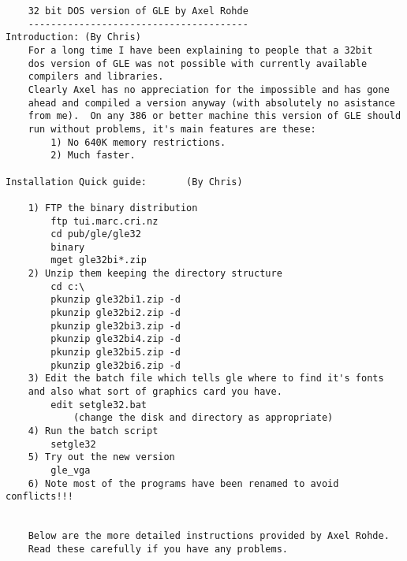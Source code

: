 \begin{center}
\begin{minipage}[t]{11.0cm}
{\scriptsize
\begin{verbatim}
	32 bit DOS version of GLE by Axel Rohde
	---------------------------------------
Introduction: (By Chris)
	For a long time I have been explaining to people that a 32bit 
	dos version of GLE was not possible with currently available 
	compilers and libraries.
	Clearly Axel has no appreciation for the impossible and has gone
	ahead and compiled a version anyway (with absolutely no asistance
	from me).  On any 386 or better machine this version of GLE should 
	run without problems, it's main features are these:
		1) No 640K memory restrictions.
		2) Much faster.

Installation Quick guide:       (By Chris)

	1) FTP the binary distribution
		ftp tui.marc.cri.nz
		cd pub/gle/gle32
		binary
		mget gle32bi*.zip
	2) Unzip them keeping the directory structure
		cd c:\
		pkunzip gle32bi1.zip -d
		pkunzip gle32bi2.zip -d
		pkunzip gle32bi3.zip -d
		pkunzip gle32bi4.zip -d
		pkunzip gle32bi5.zip -d
		pkunzip gle32bi6.zip -d
	3) Edit the batch file which tells gle where to find it's fonts
	and also what sort of graphics card you have.  
		edit setgle32.bat
			(change the disk and directory as appropriate)
	4) Run the batch script
		setgle32
	5) Try out the new version
		gle_vga
	6) Note most of the programs have been renamed to avoid conflicts!!!


	Below are the more detailed instructions provided by Axel Rohde.
	Read these carefully if you have any problems.
\end{verbatim}
}
\end{minipage}
\end{center}
\clearpage
